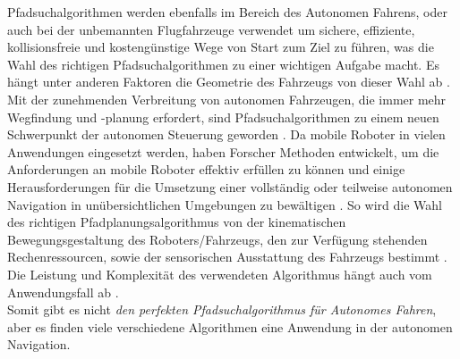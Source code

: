 Pfadsuchalgorithmen werden ebenfalls im Bereich des Autonomen Fahrens, oder auch bei der unbemannten Flugfahrzeuge verwendet
um sichere, effiziente, kollisionsfreie und kostengünstige Wege von Start zum Ziel zu führen, was die Wahl des richtigen Pfadsuchalgorithmen
zu einer wichtigen Aufgabe macht. Es hängt unter anderen Faktoren die Geometrie des Fahrzeugs von dieser Wahl ab \cite{Karur:21}.
Mit der zunehmenden Verbreitung von autonomen Fahrzeugen, die immer mehr Wegfindung und -planung erfordert, sind Pfadsuchalgorithmen
zu einem neuen Schwerpunkt der autonomen Steuerung geworden \cite{Karur:21}.
Da mobile Roboter in vielen Anwendungen eingesetzt werden, haben Forscher Methoden entwickelt, um die 
Anforderungen an mobile Roboter effektiv erfüllen zu können und einige Herausforderungen für die Umsetzung einer vollständig oder
teilweise autonomen Navigation in unübersichtlichen Umgebungen zu bewältigen \cite{Karur:21}.
So wird die Wahl des richtigen Pfadplanungsalgorithmus von der kinematischen Bewegungsgestaltung des Roboters/Fahrzeugs,
den zur Verfügung stehenden Rechenressourcen, sowie der sensorischen Ausstattung des Fahrzeugs bestimmt \cite{Karur:21}.
\noindent \\
Die Leistung und Komplexität des verwendeten Algorithmus hängt auch vom Anwendungsfall ab \cite{Karur:21}. \\
Somit gibt es nicht \emph{den perfekten Pfadsuchalgorithmus für Autonomes Fahren}, aber es finden viele verschiedene Algorithmen eine 
Anwendung in der autonomen Navigation.